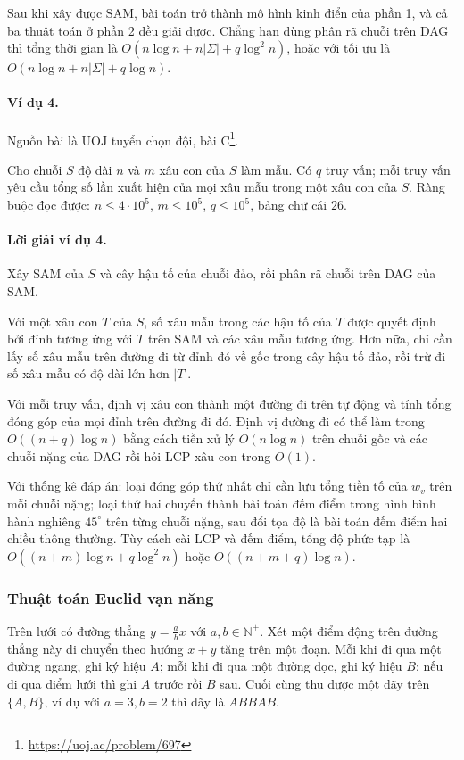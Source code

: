 \documentclass[11pt]{article}
\begin{document}
Sau khi xây được SAM, bài toán trở thành mô hình kinh điển của phần 1, và cả ba
thuật toán ở phần 2 đều giải được. Chẳng hạn dùng phân rã chuỗi trên DAG thì
tổng thời gian là $O(n\log n+n|\Sigma|+q\log^2 n)$, hoặc với tối ưu là
$O(n\log n+n|\Sigma|+q\log n)$.

\paragraph{Ví dụ 4.}
Nguồn bài là UOJ tuyển chọn đội, bài C\footnote{\url{https://uoj.ac/problem/697}}.

Cho chuỗi $S$ độ dài $n$ và $m$ xâu con của $S$ làm mẫu. Có $q$ truy vấn; mỗi
truy vấn yêu cầu tổng số lần xuất hiện của mọi xâu mẫu trong một xâu con của
$S$. Ràng buộc đọc được: $n\le 4\cdot 10^5$, $m\le 10^5$, $q\le 10^5$, bảng chữ
cái $26$.

\paragraph{Lời giải ví dụ 4.}
Xây SAM của $S$ và cây hậu tố của chuỗi đảo, rồi phân rã chuỗi trên DAG của SAM.

Với một xâu con $T$ của $S$, số xâu mẫu trong các hậu tố của $T$ được quyết định
bởi đỉnh tương ứng với $T$ trên SAM và các xâu mẫu tương ứng. Hơn nữa, chỉ cần
lấy số xâu mẫu trên đường đi từ đỉnh đó về gốc trong cây hậu tố đảo, rồi trừ đi
số xâu mẫu có độ dài lớn hơn $|T|$.

Với mỗi truy vấn, định vị xâu con thành một đường đi trên tự động và tính tổng
đóng góp của mọi đỉnh trên đường đi đó. Định vị đường đi có thể làm trong
$O((n+q)\log n)$ bằng cách tiền xử lý $O(n\log n)$ trên chuỗi gốc và các chuỗi
nặng của DAG rồi hỏi LCP xâu con trong $O(1)$.

Với thống kê đáp án: loại đóng góp thứ nhất chỉ cần lưu tổng tiền tố của
$w_v$ trên mỗi chuỗi nặng; loại thứ hai chuyển thành bài toán đếm điểm trong
hình bình hành nghiêng $45^\circ$ trên từng chuỗi nặng, sau đổi tọa độ là bài
toán đếm điểm hai chiều thông thường. Tùy cách cài LCP và đếm điểm, tổng độ phức
tạp là $O((n+m)\log n+q\log^2 n)$ hoặc $O((n+m+q)\log n)$.

\subsubsection{Thuật toán Euclid vạn năng}

Trên lưới có đường thẳng $y=\frac abx$ với $a,b\in\mathbb{N}^{+}$. Xét một điểm
động trên đường thẳng này di chuyển theo hướng $x+y$ tăng trên một đoạn. Mỗi khi
đi qua một đường ngang, ghi ký hiệu $A$; mỗi khi đi qua một đường dọc, ghi ký
hiệu $B$; nếu đi qua điểm lưới thì ghi $A$ trước rồi $B$ sau. Cuối cùng thu được
một dãy trên $\{A,B\}$, ví dụ với $a=3,b=2$ thì dãy là $ABBAB$.
\end{document}
